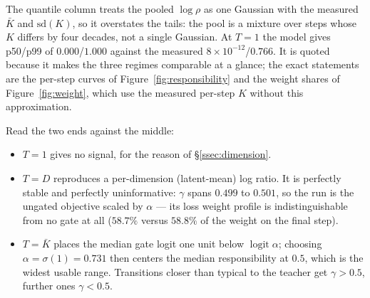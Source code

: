 \documentclass[11pt,a4paper]{article}
\begin{document}
\begin{table}[htbp]
\centering
\caption{Temperature candidates evaluated at the measured $\bar{K}=99.5$ with
$\mathrm{sd}(K)=128.6$ and $D=131072$. Quantiles of $\gamma$ combine the Gaussian draw of
\eqref{eq:law} with the spread of $K$ across the pool. The last two columns describe the loss
weight profile over the ten observed steps.}
\label{tab:temperature}
\end{table}

The quantile column treats the pooled $\log\rho$ as one Gaussian with the measured $\bar{K}$ and
$\mathrm{sd}(K)$, so it overstates the tails: the pool is a mixture over steps whose $K$ differs by
four decades, not a single Gaussian. At $T=1$ the model gives p50/p99 of $0.000$/$1.000$ against
the measured $8\times10^{-12}$/$0.766$. It is quoted because it makes the three regimes comparable
at a glance; the exact statements are the per-step curves of Figure~\ref{fig:responsibility} and
the weight shares of Figure~\ref{fig:weight}, which use the measured per-step $K$ without this
approximation.

Read the two ends against the middle:
\begin{itemize}[leftmargin=1.4em,itemsep=0.25em]
\item $T=1$ gives no signal, for the reason of \S\ref{ssec:dimension}.
\item $T=D$ reproduces a per-dimension (latent-mean) log ratio. It is perfectly stable and
      perfectly uninformative: $\gamma$ spans $0.499$ to $0.501$, so the run is the ungated
      objective scaled by $\alpha$ --- its loss weight profile is indistinguishable from no gate
      at all ($58.7\%$ versus $58.8\%$ of the weight on the final step).
\item $T=\bar{K}$ places the median gate logit one unit below $\operatorname{logit}\alpha$;
      choosing $\alpha=\sigma(1)=0.731$ then centers the median responsibility at $0.5$, which is
      the widest usable range. Transitions closer than typical to the teacher get
      $\gamma>0.5$, further ones $\gamma<0.5$.
\end{itemize}
\end{document}
